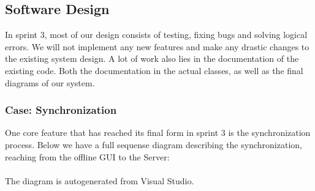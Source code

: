 \subsection{Software Design}
In sprint 3, most of our design consists of testing, fixing bugs and solving logical errors. We will not implement any new features and make any drastic changes to the existing system design. A lot of work also lies in the documentation of the existing code. Both the documentation in the actual classes, as well as the final diagrams of our system. 
\subsubsection{Case: Synchronization}
One core feature that has reached its final form in sprint 3 is the synchronization process. Below we have a full sequense diagram describing the synchronization, reaching from the offline GUI to the Server:\\
[Appendix, Figur \ref{clientsyncsequencediagram} and \ref{serversyncsequencediagram}, page \pageref{clientsyncsequencediagram} and \pageref{serversyncsequencediagram}]\\
The diagram is autogenerated from Visual Studio. 

